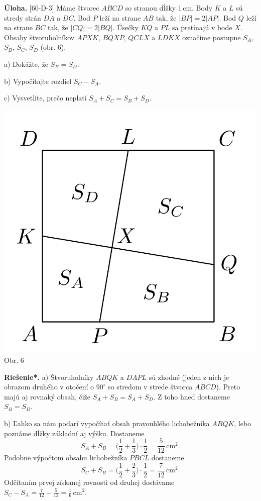 \documentclass[11pt,a4paper,oneside,final]{book}
\newcommand{\ul}{\textbf{Úloha.} }
\newcommand{\rieh}{\textbf{Riešenie*.} }
\begin{document}
\begin{tcolorbox}[breakable,notitle,boxrule=0pt,colback=light-gray,colframe=light-gray]\ul [60-D-3]  Máme štvorec $ABCD$ so stranou dĺžky 1\,cm. Body $K$ a $L$ sú stredy strán $DA$ a $DC$. Bod $P$ leží na strane $AB$ tak, že $| BP | = 2 | AP |$. Bod $Q$ leží na strane $BC$ tak, že $| CQ | = 2 | BQ |$. Úsečky $KQ$ a $PL$ sa pretínajú v bode $X$. Obsahy štvoruholníkov $APXK$, $BQXP$, $QCLX$ a $LDKX$ označíme postupne $S_A$, $S_B$, $S_C$, $S_D$ (obr. 6).

a) Dokážte, že $S_B = S_D$.

b) Vypočítajte rozdiel $S_C - S_A$.

c) Vysvetlite, prečo neplatí $S_A + S_C = S_B + S_D$.
\begin{center}
\includegraphics{60D31}\\

Obr. 6
\end{center}
\end{tcolorbox}

\rieh  a) Štvoruholníky $ABQK$ a $DAPL$ sú zhodné (jeden z nich je obrazom druhého v otočení o $90^\circ$ so stredom v strede štvorca $ABCD$). Preto majú aj rovnaký obsah, čiže $S_A + S_B = S_A + S_D$. Z toho hneď dostaneme $S_B = S_D$.

b) Ľahko sa nám podarí vypočítať obsah pravouhlého lichobežníka $ABQK$, lebo poznáme dĺžky základní aj výšku. Dostaneme
$$S_A + S_B =\bigg( \frac{1}{2}+\frac{1}{3}\bigg)\cdot \frac{1}{2}=\frac{5}{12}\,\text{cm}^2.$$
Podobne výpočtom obsahu lichobežníka $PBCL$ dostaneme
$$S_C + S_B =\bigg(\frac{1}{2}+\frac{2}{3}\bigg)\cdot\frac{1}{2}=\frac{7}{12}\,\text{cm}^2.$$
Odčítaním prvej získanej rovnosti od druhej dostávame $S_C - S_A =\frac{7}{12}-\frac{5}{12}=\frac{1}{6}\,\text{cm}^2$.
\end{document}
